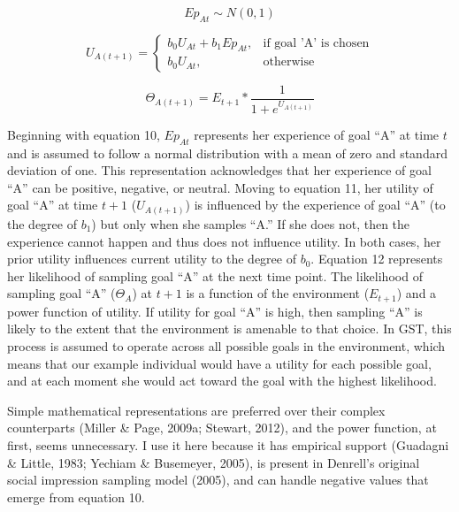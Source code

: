 \documentclass[english,,man]{apa6}
\theoremstyle{definition}
\theoremstyle{definition}
\theoremstyle{definition}
\theoremstyle{remark}
\begin{document}
\begin{equation}
Ep_{At} \sim {N}(0,1)
\end{equation}

\begin{equation}
U_{A(t+1)} = 
  \begin{cases}
  b_0 U_{At} + b_1 Ep_{At}, & \text{if goal 'A' is chosen}\\
  b_0 U_{At}, & \text{otherwise}
  \end{cases}
\end{equation}

\begin{equation}
\Theta_{A(t+1)} = E_{t+1} * {\frac {1}{1 + e^{U_{A(t+1)}}}}
\end{equation}

Beginning with equation 10, \(Ep_{At}\) represents her experience of
goal \enquote{A} at time \(t\) and is assumed to follow a normal
distribution with a mean of zero and standard deviation of one. This
representation acknowledges that her experience of goal \enquote{A} can
be positive, negative, or neutral. Moving to equation 11, her utility of
goal \enquote{A} at time \(t+1\) (\(U_{A(t+1)}\)) is influenced by the
experience of goal \enquote{A} (to the degree of \(b_1\)) but only when
she samples \enquote{A.} If she does not, then the experience cannot
happen and thus does not influence utility. In both cases, her prior
utility influences current utility to the degree of \(b_0\). Equation 12
represents her likelihood of sampling goal \enquote{A} at the next time
point. The likelihood of sampling goal \enquote{A} (\(\Theta_{A}\)) at
\(t+1\) is a function of the environment (\(E_{t+1}\)) and a power
function of utility. If utility for goal \enquote{A} is high, then
sampling \enquote{A} is likely to the extent that the environment is
amenable to that choice. In GST, this process is assumed to operate
across all possible goals in the environment, which means that our
example individual would have a utility for each possible goal, and at
each moment she would act toward the goal with the highest likelihood.

Simple mathematical representations are preferred over their complex
counterparts (Miller \& Page, 2009a; Stewart, 2012), and the power
function, at first, seems unnecessary. I use it here because it has
empirical support (Guadagni \& Little, 1983; Yechiam \& Busemeyer,
2005), is present in Denrell's original social impression sampling model
(2005), and can handle negative values that emerge from equation 10.
\end{document}
